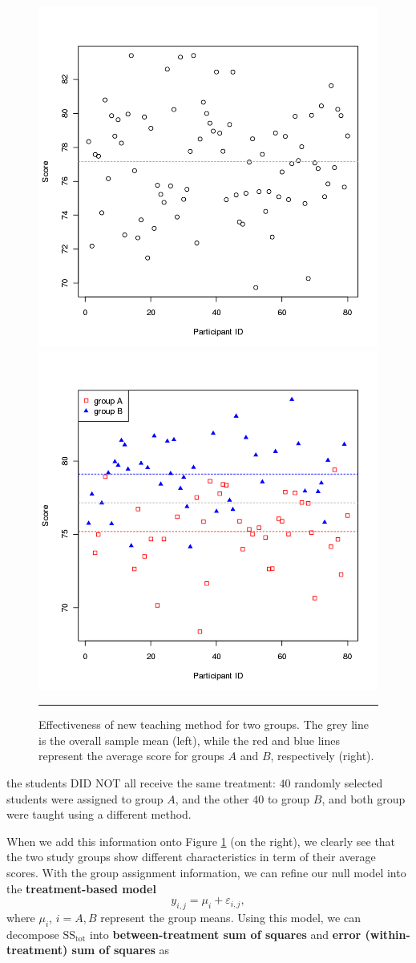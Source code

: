 \begin{figure}[t]
\centering
  \includegraphics[width=0.485\linewidth]{Images/testA1.png} \quad 
  \includegraphics[width=0.485\linewidth]{Images/testA2.png}
  \caption[\small Effectiveness of new teaching method (two groups)]{\small Effectiveness of new teaching method for two groups. The grey line is the overall sample mean (left), while the red and blue lines represent the average score for groups $A$ and $B$, respectively (right).}
  \label{fig:testA1} \hrule
\end{figure}
the students DID NOT all receive the same treatment: $40$ randomly selected students were assigned to group $A$, and the other $40$ to group $B$, and both group were taught using a different method. \par When we add this information onto Figure \ref{fig:testA1} (on the right), we clearly see that the two study groups show different characteristics in term of their average scores. \newpage\noindent With the group assignment information, we can refine our null model into the  \textbf{treatment-based model}
$$%
    y_{i,j}=\mu_{i}+\varepsilon_{i,j},
$$
where $\mu_i$, $i={A,B}$ represent the group means. \newl Using this model, we can decompose $\text{SS}_{\textrm{tot}}$ into \textbf{between-treatment sum of squares} and \textbf{error (within-treatment) sum of squares} as
